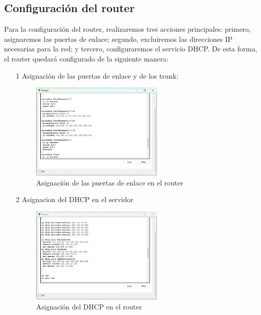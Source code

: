     \subsection*{Configuración del router}
    Para la configuración del router, realizaremos tres acciones principales: primero, asignaremos las puertas de enlace; segundo, excluiremos las direcciones IP necesarias para la red; y tercero, configuraremos el servicio DHCP. De esta forma, el router quedará configurado de la siguiente manera:
    
    \begin{enumerate}
        \item [1] Asignación de las puertas de enlace y de los trunk:
        \begin{figure}[H]
            \centering
            \includegraphics[width=0.6\textwidth]{img/Iprouter.png}
            \caption{Asignación de las puertas de enlace en el router}
            \label{fig:routerip}
        \end{figure}
        
        \item [2] Asignacion del DHCP en el servidor
        
        \begin{figure}[H]
            \centering
            \includegraphics[width=0.6\textwidth]{img/dchpRouter.png}
            \caption{Asignación del DHCP en el router}
            \label{fig:routerDhcp}
        \end{figure}
    
    \end{enumerate}

